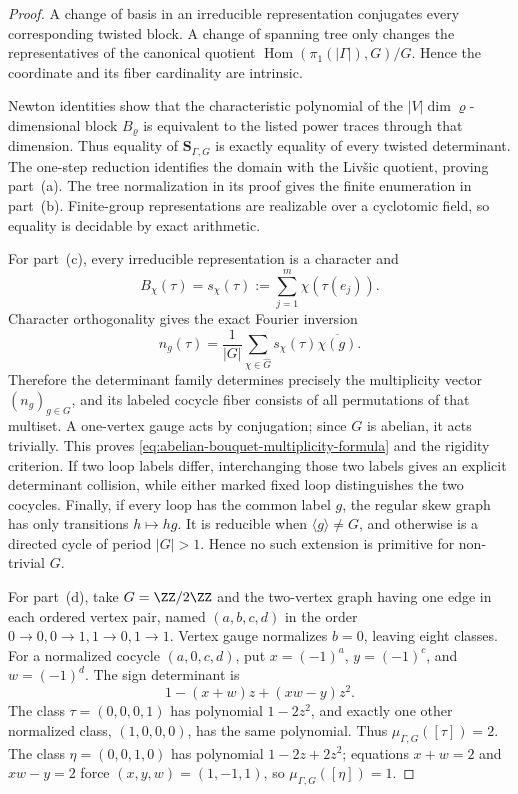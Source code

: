 \begin{proof}
  A change of basis in an irreducible representation conjugates every
  corresponding twisted block.  A change of spanning tree only changes the
  representatives of the canonical quotient
  \(\operatorname{Hom}(\pi_1(|\Gamma|),G)/G\).  Hence the coordinate and its
  fiber cardinality are intrinsic.

  Newton identities show that the characteristic polynomial of the
  \(|V|\dim\varrho\)-dimensional block \(B_\varrho\) is equivalent to the
  listed power traces through that dimension.  Thus equality of
  \(\mathbf S_{\Gamma,G}\) is exactly equality of every twisted determinant.
  The one-step reduction
   identifies the domain with the
  Liv\v{s}ic quotient, proving part~(a).  The tree normalization in its proof
  gives the finite enumeration in part~(b).  Finite-group representations
  are realizable over a cyclotomic field, so equality is decidable by exact
  arithmetic.

  For part~(c), every irreducible representation is a character and
  \[
    B_\chi(\tau)=s_\chi(\tau)
    :=\sum_{j=1}^m\chi(\tau(e_j)).
  \]
  Character orthogonality gives the exact Fourier inversion
  \begin{equation}\label{eq:abelian-bouquet-fourier-inversion}
    n_g(\tau)=\frac1{|G|}
      \sum_{\chi\in\widehat G}s_\chi(\tau)\overline{\chi(g)}.
  \end{equation}
  Therefore the determinant family determines precisely the multiplicity
  vector \((n_g)_{g\in G}\), and its labeled cocycle fiber consists of all
  permutations of that multiset.  A one-vertex gauge acts by conjugation;
  since \(G\) is abelian, it acts trivially.  This proves
  \eqref{eq:abelian-bouquet-multiplicity-formula} and the rigidity criterion.
  If two loop labels differ, interchanging those two labels gives an explicit
  determinant collision, while either marked fixed loop distinguishes the
  two cocycles.  Finally, if every loop has the common label \(g\), the
  regular skew graph has only transitions \(h\mapsto hg\).  It is reducible
  when \(\langle g\rangle\ne G\), and otherwise is a directed cycle of period
  \(|G|>1\).  Hence no such extension is primitive for non-trivial \(G\).

  For part~(d), take \(G=\ZZ/2\ZZ\) and the two-vertex graph having one edge
  in each ordered vertex pair, named \((a,b,c,d)\) in the order
  \(0\to0,0\to1,1\to0,1\to1\).  Vertex gauge normalizes \(b=0\), leaving
  eight classes.  For a normalized cocycle \((a,0,c,d)\), put
  \(x=(-1)^a\), \(y=(-1)^c\), and \(w=(-1)^d\).  The sign determinant is
  \begin{equation}\label{eq:two-vertex-z2-sign-polynomial}
    1-(x+w)z+(xw-y)z^2.
  \end{equation}
  The class \(\tau=(0,0,0,1)\) has polynomial \(1-2z^2\), and exactly one
  other normalized class, \((1,0,0,0)\), has the same polynomial.  Thus
  \(\mu_{\Gamma,G}([\tau])=2\).  The class
  \(\eta=(0,0,1,0)\) has polynomial \(1-2z+2z^2\); equations
  \(x+w=2\) and \(xw-y=2\) force \((x,y,w)=(1,-1,1)\), so
  \(\mu_{\Gamma,G}([\eta])=1\).


\end{proof}
